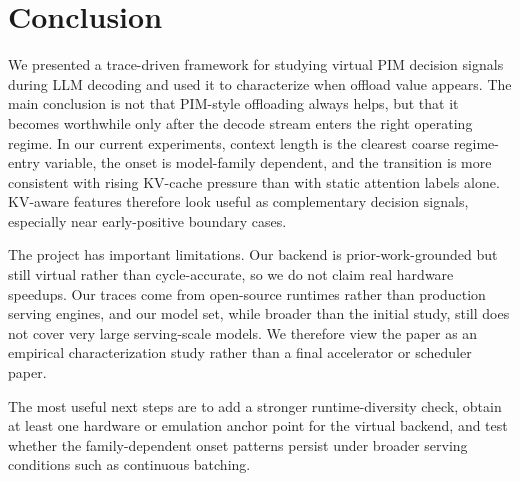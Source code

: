 \section{Conclusion}
\label{sec:conclusion}

We presented a trace-driven framework for studying virtual PIM decision signals during LLM decoding and used it to characterize when offload value appears. The main conclusion is not that PIM-style offloading always helps, but that it becomes worthwhile only after the decode stream enters the right operating regime. In our current experiments, context length is the clearest coarse regime-entry variable, the onset is model-family dependent, and the transition is more consistent with rising KV-cache pressure than with static attention labels alone. KV-aware features therefore look useful as complementary decision signals, especially near early-positive boundary cases.

The project has important limitations. Our backend is prior-work-grounded but still virtual rather than cycle-accurate, so we do not claim real hardware speedups. Our traces come from open-source runtimes rather than production serving engines, and our model set, while broader than the initial study, still does not cover very large serving-scale models. We therefore view the paper as an empirical characterization study rather than a final accelerator or scheduler paper.

The most useful next steps are to add a stronger runtime-diversity check, obtain at least one hardware or emulation anchor point for the virtual backend, and test whether the family-dependent onset patterns persist under broader serving conditions such as continuous batching.
